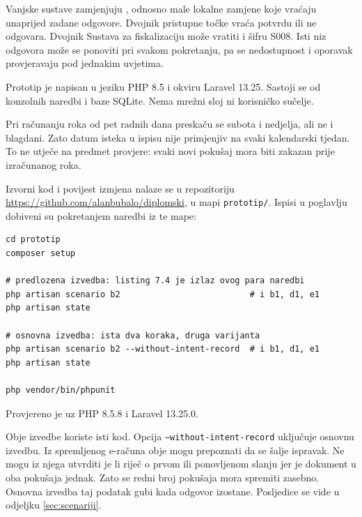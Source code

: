 Vanjske sustave zamjenjuju , odnosno male
lokalne zamjene koje vraćaju unaprijed zadane odgovore. Dvojnik pristupne
točke vraća potvrdu ili ne odgovara. Dvojnik Sustava za fiskalizaciju može
vratiti i šifru S008. Isti niz odgovora može se ponoviti pri svakom
pokretanju, pa se nedostupnost i oporavak provjeravaju pod jednakim uvjetima.

Prototip je napisan u jeziku PHP 8.5 i okviru Laravel 13.25. Sastoji se od
konzolnih naredbi i baze SQLite. Nema mrežni sloj ni korisničko sučelje.

Pri računanju roka od pet radnih dana preskaču se subota i nedjelja, ali ne
i blagdani. Zato datum isteka u ispisu nije primjenjiv na svaki kalendarski
tjedan. To ne utječe na predmet provjere: svaki novi pokušaj mora biti
zakazan prije izračunanog roka.

\begin{sloppypar}
Izvorni kod i povijest izmjena nalaze se u repozitoriju
\url{https://github.com/alanbubalo/diplomski}, u mapi \texttt{prototip/}.
Ispisi u poglavlju dobiveni su pokretanjem naredbi iz te mape:
\end{sloppypar}

\begin{lstlisting}[caption={[Naredbe kojima se ispisi ponavljaju]Naredbe kojima
se ispisi iz ovog poglavlja ponavljaju. Svaki \texttt{scenario} iznova gradi
bazu, pa \texttt{state} pokazuje stanje one varijante koja je zadnja
pokrenuta. Sat prototipa je fiksiran, pa je izlaz jednak pri svakom
pokretanju.}, label={lst:naredbe}, basicstyle=\ttfamily\small]
cd prototip
composer setup

# predlozena izvedba: listing 7.4 je izlaz ovog para naredbi
php artisan scenario b2                          # i b1, d1, e1
php artisan state

# osnovna izvedba: ista dva koraka, druga varijanta
php artisan scenario b2 --without-intent-record  # i b1, d1, e1
php artisan state

php vendor/bin/phpunit
\end{lstlisting}

Provjereno je uz PHP 8.5.8 i Laravel 13.25.0.

Obje izvedbe koriste isti kod. Opcija \texttt{--without-intent-record}
uključuje osnovnu izvedbu. Iz spremljenog e-računa obje mogu prepoznati da
se šalje ispravak. Ne mogu iz njega utvrditi je li riječ o prvom ili
ponovljenom slanju jer je dokument u oba pokušaja jednak. Zato se redni broj
pokušaja mora spremiti zasebno. Osnovna izvedba taj podatak gubi kada odgovor
izostane. Posljedice se vide u odjeljku \ref{sec:scenariji}.

